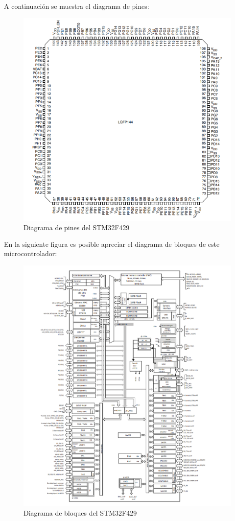 \documentclass[12pt,a4paper]{article}
\begin{document}
A continuación se muestra el diagrama de pines:

\begin{figure}[H]
    \centering
    \includegraphics[width=0.7\linewidth]{Imagenes/pins.png}
    \caption{Diagrama de pines del STM32F429 \cite{hoja}}
    \label{fig:1}
\end{figure}

En la siguiente figura es posible apreciar el diagrama de bloques de este microcontrolador:

\begin{figure}[H]
    \centering
    \includegraphics[width=0.9\linewidth]{Imagenes/block.png}
    \caption{Diagrama de bloques del STM32F429 \cite{hoja}}
    \label{fig:1}
\end{figure}
\end{document}

